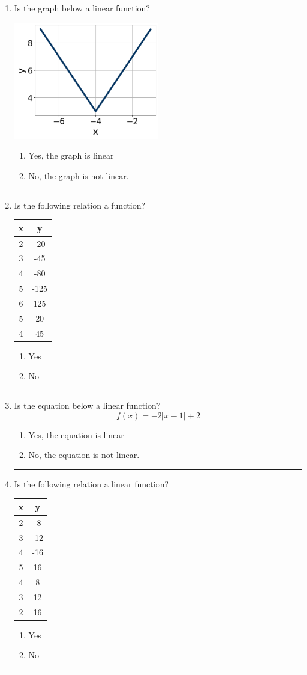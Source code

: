 \documentclass[14pt]{extbook}
\newcommand{\litem}[1]{\item#1\hspace*{-1cm}\rule{\textwidth}{0.4pt}}
\begin{document}
\begin{enumerate}
{\begin{enumerate}[label=\Alph*.]
\end{enumerate} }
\litem{
Is the graph below a linear function?
\begin{center}
    \includegraphics[width=0.5\textwidth]{../Figures/MA_8_F_1_2_graphF.png}
\end{center}
\begin{enumerate}[label=\Alph*.]
\item Yes, the graph is linear
\item No, the graph is not linear.

\end{enumerate} }
\litem{
Is the following relation a function?

\begin{tabular}{c|c}
x &y\tabularnewline \hline
2 &-20\tabularnewline \hline
3 &-45\tabularnewline \hline
4 &-80\tabularnewline \hline
5 &-125\tabularnewline \hline
6 &125\tabularnewline \hline
5 &20\tabularnewline \hline
4 &45\end{tabular}\begin{enumerate}[label=\Alph*.]
\item Yes
\item No

\end{enumerate} }
\litem{
Is the equation below a linear function?\[ f(x) = -2|x -1|+2 \]\begin{enumerate}[label=\Alph*.]
\item Yes, the equation is linear
\item No, the equation is not linear.

\end{enumerate} }
\litem{
Is the following relation a linear function?

\begin{tabular}{c|c}
x &y\tabularnewline \hline
2 &-8\tabularnewline \hline
3 &-12\tabularnewline \hline
4 &-16\tabularnewline \hline
5 &16\tabularnewline \hline
4 &8\tabularnewline \hline
3 &12\tabularnewline \hline
2 &16\end{tabular}\begin{enumerate}[label=\Alph*.]
\item Yes
\item No


\end{enumerate}}
\end{enumerate}
\end{document}
